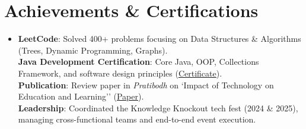 \documentclass[letterpaper,12pt]{article}
\begin{document}
\section{Achievements \& Certifications}
 \begin{itemize}[leftmargin=0.15in, label={}]
    \item{
     \textbf{LeetCode}{: Solved 400+ problems focusing on Data Structures \& Algorithms (Trees, Dynamic Programming, Graphs).} \\
     \textbf{Java Development Certification}{: Core Java, OOP, Collections Framework, and software design principles (\href{https://drive.google.com/file/d/19W0G-xFzkwkhkULccCE2gLa9lP_WyJ1U/view?usp=drive_link}{\underline{Certificate}}).} \\
     \textbf{Publication}{: Review paper in \textit{Pratibodh} on `Impact of Technology on Education and Learning'' (\href{https://pratibodh.org/index.php/pratibodh/article/view/345}{\underline{Paper}}).} \\
     \textbf{Leadership}{: Coordinated the Knowledge Knockout tech fest (2024 \& 2025), managing cross-functional teams and end-to-end event execution.}
    }
 \end{itemize}
\end{document}
